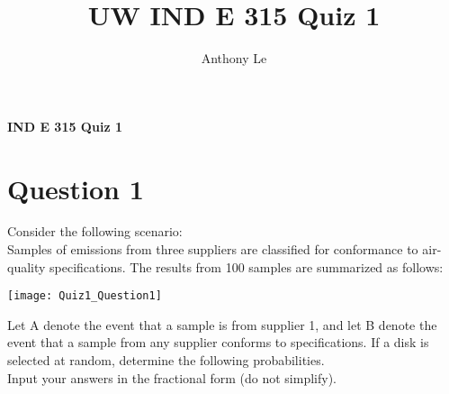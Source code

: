 \documentclass[../INDE315_HW.tex]{subfiles}
\title{UW IND E 315 Quiz 1}
\author{Anthony Le}
\begin{document}
\pagestyle{fancy}
\fancyhead{}


\begin{center}
    \LARGE{\textbf{IND E 315 Quiz 1}}
\end{center}

\section*{Question 1}
Consider the following scenario: \\
Samples of emissions from three suppliers are classified for conformance to air-quality specifications. The results from 100 samples are summarized as follows:
\begin{center}
    \texttt{[image: Quiz1\_Question1]}
\end{center}
Let A denote the event that a sample is from supplier 1, and let B denote the event that a sample from any supplier conforms to specifications. If a disk is selected at random, determine the following probabilities. \\
Input your answers in the fractional form (do not simplify).
\end{document}
